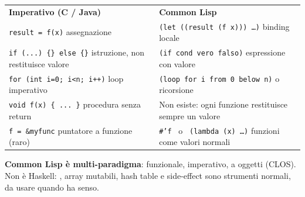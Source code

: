 \begin{confronto}
\renewcommand{\arraystretch}{1.4}
\small
\begin{tabular}{@{}p{5.8cm}p{6.0cm}@{}}
\rowcolor{boxCfFrame!12}
\textbf{\color{boxCfFrame!80!black}Imperativo (C / Java)} &
\textbf{\color{csBlue}Common Lisp} \\[2pt]
%
\texttt{result = f(x)} \newline
{\footnotesize\color{black!55}assegnazione} &
\texttt{(let ((result (f x))) \ldots)} \newline
{\footnotesize\color{black!55}binding locale} \\
\hline
\texttt{if (...) \{\} else \{\}} \newline
{\footnotesize\color{black!55}istruzione, non restituisce valore} &
\texttt{(if cond vero falso)} \newline
{\footnotesize\color{black!55}espressione con valore} \\
\hline
\texttt{for (int i=0; i<n; i++)} \newline
{\footnotesize\color{black!55}loop imperativo} &
\texttt{(loop for i from 0 below n)} \newline
{\footnotesize\color{black!55}o ricorsione} \\
\hline
\texttt{void f(x) \{ ... \}} \newline
{\footnotesize\color{black!55}procedura senza return} &
{\footnotesize\color{black!55}Non esiste: ogni funzione} \newline
{\footnotesize\color{black!55}restituisce sempre un valore} \\
\hline
\texttt{f = \&myfunc} \newline
{\footnotesize\color{black!55}puntatore a funzione (raro)} &
\texttt{\#'f} \ o \ \texttt{(lambda (x) \ldots)} \newline
{\footnotesize\color{black!55}funzioni come valori normali} \\
\end{tabular}
\end{confronto}

\seprule

\begin{intuizione}
\textbf{Common Lisp è multi-paradigma}: funzionale, imperativo, a oggetti (CLOS).
Non è Haskell: , array mutabili, hash table e side-effect
sono strumenti normali, da usare quando ha senso.

\end{intuizione}

